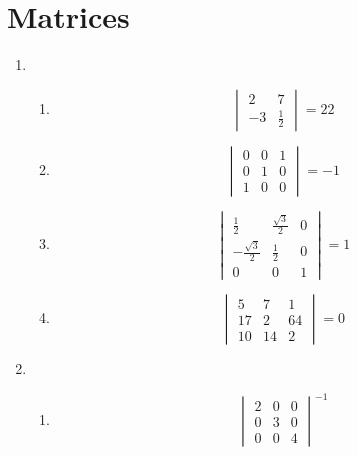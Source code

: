 \documentclass[a4paper]{report}
\begin{document}
\chapter{Matrices}
\begin{enumerate}
	\item
	\begin{enumerate}
		\item
			\begin{equation*}
				\begin{vmatrix}
					2 & 7\\
					-3 & \frac{1}{2}
				\end{vmatrix}
				=
				22
			\end{equation*}
		\item
			\begin{equation*}
				\begin{vmatrix}
					0 & 0 & 1\\
					0 & 1 & 0\\
					1 & 0 & 0
				\end{vmatrix}
				=
				-1
			\end{equation*}
		\item
			\begin{equation*}
				\begin{vmatrix}
					\frac{1}{2} & \frac{\sqrt{3}}{2} & 0\\
					-\frac{\sqrt{3}}{2} & \frac{1}{2} & 0\\
					0 & 0 & 1
				\end{vmatrix}
				=
				1
			\end{equation*}
		\item
			\begin{equation*}
				\begin{vmatrix}
					5 & 7 & 1\\
					17 & 2 & 64\\
					10 & 14 & 2
				\end{vmatrix}
				=
				0
			\end{equation*}
	\end{enumerate}
\item
	\begin{enumerate}
		\item
			\begin{equation*}
				\begin{vmatrix}
					2 & 0 & 0\\
					0 & 3 & 0\\
					0 & 0 & 4
				\end{vmatrix}^{-1}

\end{equation*}
\end{enumerate}
\end{enumerate}
\end{document}
